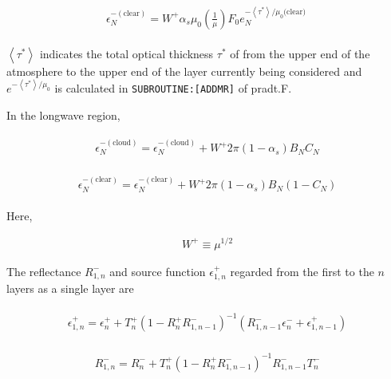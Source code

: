 \begin{eqnarray}
\begin{array}{l}
\epsilon_{N}^{-(\text {clear})}=W^{+} \alpha_{s} \mu_{0}\left(\frac{1}{\mu}\right) F_{0} e_{N}^{-\left\langle\tau^{*}\right\rangle / \mu_{0} \text {(clear) }}
\end{array}
\end{eqnarray}

\(\left\langle\tau^{*}\right\rangle\) indicates the total optical thickness \(\tau^{*}\) of from the upper end of the atmosphere to the upper end of the layer currently being considered and
\(e^{-\left\langle\tau^{*}\right\rangle / \mu_{0}}\) is calculated in \texttt{SUBROUTINE:{[}ADDMR{]}} of pradt.F.

In the longwave region,

\begin{eqnarray}
\begin{array}{l}
\epsilon_{N}^{-(\text {cloud})}=\epsilon_{N}^{-(\text {cloud})}+W^{+} 2 \pi\left(1-\alpha_{s}\right) B_{N} C_{N}
\end{array}
\end{eqnarray}

\begin{eqnarray}
\begin{array}{l}
\epsilon_{N}^{-(\text {clear})}=\epsilon_{N}^{-(\text {clear})}+W^{+} 2 \pi\left(1-\alpha_{s}\right) B_{N}\left(1-C_{N}\right)
\end{array}
\end{eqnarray}

Here,

\begin{eqnarray}
W^{+} \equiv \mu^{1 / 2}
\end{eqnarray}

The reflectance \(R_{1, n}^{-}\) and source function \(\epsilon_{1, n}^{+}\) regarded from the first to the \(n\) layers as a single layer are

\begin{eqnarray}
\begin{array}{l}
\epsilon_{1, n}^{+}=\epsilon_{n}^{+}+T_{n}^{+}\left(1-R_{n}^{+} R_{1, n-1}^{-}\right)^{-1}\left(R_{1, n-1}^{-} \epsilon_{n}^{-}+\epsilon_{1, n-1}^{+}\right)
\end{array}
\end{eqnarray}

\begin{eqnarray}
\begin{array}{l}
R_{1, n}^{-}=R_{n}^{-}+T_{n}^{+}\left(1-R_{n}^{+} R_{1, n-1}^{-}\right)^{-1} R_{1, n-1}^{-} T_{n}^{-}
\end{array}
\end{eqnarray}

